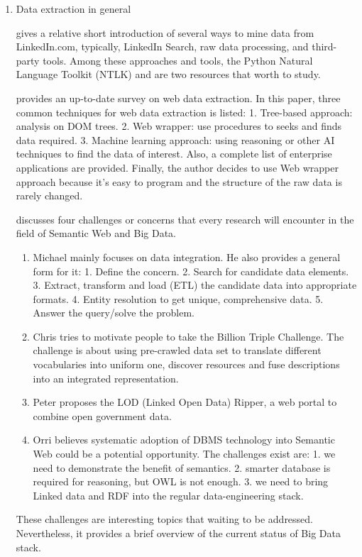 \begin{enumerate}
\item
Data extraction in general

\cite{bradbury2011} gives a relative short introduction of several ways to mine data from LinkedIn.com, typically, LinkedIn Search, raw data processing, and third-party tools. Among these approaches and tools, the Python Natural Language Toolkit (NTLK) and \cite{russell2011} are two resources that worth to study.

\cite{ferrara2012} provides an up-to-date survey on web data extraction. In this paper, three common techniques for web data extraction is listed: 1. Tree-based approach: analysis on DOM trees. 2. Web wrapper: use procedures to seeks and finds data required. 3. Machine learning approach: using reasoning or other AI techniques to find the data of interest. Also, a complete list of enterprise applications are provided. Finally, the author decides to use Web wrapper approach because it's easy to program and the structure of the raw data is rarely changed.

\cite{bizer2012} discusses four challenges or concerns that every research will encounter in the field of Semantic Web and Big Data. 

  \begin{enumerate}
    \item
      Michael mainly focuses on data integration. He also provides a general form for it: 1. Define the concern. 2. Search for candidate data elements. 3. Extract, transform and load (ETL) the candidate data into appropriate formats. 4. Entity resolution to get unique, comprehensive data. 5. Answer the query/solve the problem. 
    \item
      Chris tries to motivate people to take the Billion Triple Challenge. The challenge is about using pre-crawled data set to translate different vocabularies into uniform one, discover resources and fuse descriptions into an integrated representation.
    \item
      Peter proposes the LOD (Linked Open Data) Ripper, a web portal to combine open government data. 
    \item
      Orri believes systematic adoption of DBMS technology into Semantic Web could be a potential opportunity. The challenges exist are: 1. we need to demonstrate the benefit of semantics. 2. smarter database is required for reasoning, but OWL is not enough. 3. we need to bring Linked data and RDF into the regular data-engineering stack.
  \end{enumerate}
These challenges are interesting topics that waiting to be addressed. Nevertheless, it provides a brief overview of the current status of Big Data stack.


\end{enumerate}
